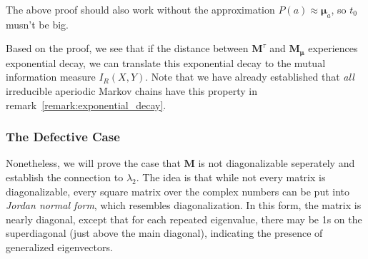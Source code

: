 \documentclass[../../main.tex]{subfiles}
\begin{document}
    \bigskip
    \begin{remark}
        The above proof should also work without the approximation $P(a) \approx \bm{\mu}_a$, so $t_0$ musn't be big.
    \end{remark}

    \begin{remark}
        Based on the proof, we see that if the distance between $\bm{M}^\tau$ and $\bm{M_\mu}$ experiences exponential decay, we can translate this exponential decay to the mutual information measure $I_R(X, Y)$. Note that we have already established that \emph{all} irreducible aperiodic Markov chains have this property in remark~\ref{remark:exponential_decay}.
    \end{remark}

\subsubsection{The Defective Case}
    Nonetheless, we will prove the case that $\bm{M}$ is not diagonalizable seperately and establish the connection to $\lambda_2$. The idea is that while not every matrix is diagonalizable, every square matrix over the complex numbers can be put into \emph{Jordan normal form}, which resembles diagonalization. In this form, the matrix is nearly diagonal, except that for each repeated eigenvalue, there may be 1s on the superdiagonal (just above the main diagonal), indicating the presence of generalized eigenvectors.
\end{document}
